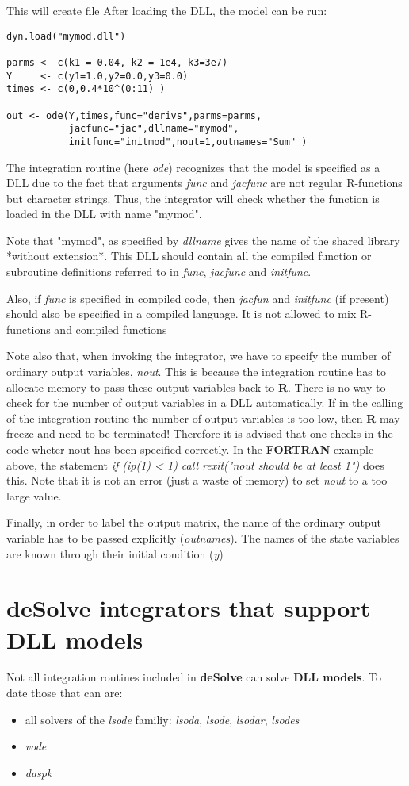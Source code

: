 \documentclass[english]{article}
\newcommand{\R}{\textbf{\textsf{R}}\xspace}
\newcommand{\deSolve}{\textbf{\textsf{deSolve}}\xspace}
\newcommand{\FOR}{\textbf{\textsf{FORTRAN}}\xspace}
\newcommand{\DLLmodels}{\textbf{\textsf{DLL models}}\xspace}
\begin{document}
This will create file 
After loading the DLL, the model can be run:
\begin{verbatim}
dyn.load("mymod.dll")

parms <- c(k1 = 0.04, k2 = 1e4, k3=3e7)
Y     <- c(y1=1.0,y2=0.0,y3=0.0)
times <- c(0,0.4*10^(0:11) )

out <- ode(Y,times,func="derivs",parms=parms,
           jacfunc="jac",dllname="mymod",
           initfunc="initmod",nout=1,outnames="Sum" ) 

\end{verbatim}

The integration routine (here \emph{ode}) recognizes that the model is specified 
as a DLL due to the fact that arguments \emph{func} and \emph{jacfunc} are not regular R-functions 
but character strings. Thus, the integrator will check whether the function is loaded in the DLL 
with name "mymod". 

Note that "mymod", as specified by \emph{dllname} gives the name of the shared library 
*without extension*. This DLL should contain all the compiled function or subroutine 
definitions referred to in \emph{func}, \emph{jacfunc} and \emph{initfunc}.

Also, if \emph{func} is specified in compiled code, then \emph{jacfun} and 
\emph{initfunc} (if present) should also be specified in a compiled language.
It is not allowed to mix R-functions and compiled functions

Note also that, when invoking the integrator, we have to specify the number of 
ordinary output variables, \emph{nout}. This is 
because the integration routine has to allocate memory to pass these output variables
back to \R. There is no way to check for the number of output variables in a DLL automatically.
If in the calling of the integration routine the number of output variables is too low,
then \R may freeze and need to be terminated! Therefore it is advised that one 
checks in the code wheter nout has been specified correctly. 
In the \FOR example above, the statement \emph{if (ip(1) < 1) call rexit("nout should be at least 1") } does this.
Note that it is not an error (just a waste of memory) to set \emph{nout} to a too large value.

Finally, in order to label the output matrix, the name of the ordinary output variable has to be passed explicitly (\emph{outnames}).
The names of the state variables are known through their initial condition (\emph{y})
\section{\deSolve integrators that support DLL models}
Not all integration routines included in \deSolve can solve \DLLmodels. To date those that can are:
\begin{itemize}
\item all solvers of the \emph{lsode} familiy: \emph{lsoda}, \emph{lsode}, \emph{lsodar}, \emph {lsodes}
\item \emph{vode}
\item \emph{daspk}
\end{itemize}
\end{document}
